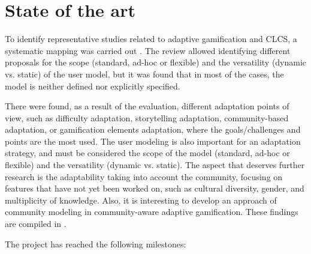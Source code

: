 \documentclass[sigconf]{acmart}
\begin{document}
\section{State of the art}




To identify representative studies related to adaptive gamification and CLCS, a systematic mapping
was carried out \cite{petersen_guidelines_2015}. The review allowed identifying different proposals for the scope (standard, ad-hoc or flexible) and the versatility (dynamic vs. static) of the user model, but it was found that in most of the cases, the model is neither defined nor explicitly specified. 

There were found, as a result of the evaluation, different adaptation points of view, such as difficulty adaptation, storytelling adaptation, community-based adaptation, or gamification elements adaptation, where the goals/challenges and points are the most used. The user modeling is also important for an adaptation strategy, and must be considered the scope of the model (standard, ad-hoc or flexible) and the versatility (dynamic vs. static). The aspect that deserves further research is the adaptability taking into account the community, focusing on features that have not yet been worked on, such as cultural diversity, gender, and multiplicity of knowledge. Also, it is interesting to develop an approach of community modeling in community-aware adaptive gamification. These findings are compiled in  \cite{ayastuy_adaptive_2021}.


The project has reached the following milestones:
\end{document}
